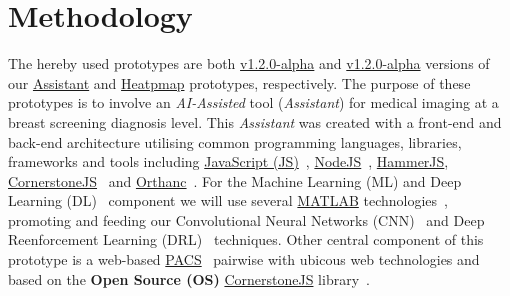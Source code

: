 
\section{Methodology}
\label{sec:sec003}

The hereby used prototypes are both \hyperlink{https://github.com/mida-project/prototype-multi-modality-assistant/releases/tag/v1.2.0-alpha}{v1.2.0-alpha} and \hyperlink{https://github.com/mida-project/prototype-heatmap/releases/tag/v1.2.0-alpha}{v1.2.0-alpha} versions of our \hyperlink{https://github.com/mida-project/prototype-multi-modality-assistant/}{Assistant} and \hyperlink{https://github.com/mida-project/prototype-heatmap}{Heatpmap} prototypes, respectively. The purpose of these prototypes is to involve an \textit{AI-Assisted} tool (\textit{Assistant}) for medical imaging at a breast screening diagnosis level. This \textit{Assistant} was created with a front-end and back-end architecture utilising common programming languages, libraries, frameworks and tools including \hyperlink{https://www.javascript.com/}{JavaScript (JS)}~\cite{flanagan2006javascript}, \hyperlink{https://nodejs.org/}{NodeJS}~\cite{wilson2018node}, \hyperlink{https://hammerjs.github.io/}{HammerJS}, \hyperlink{https://cornerstonejs.org/}{CornerstoneJS}~\cite{hostetter2018integration} and \hyperlink{https://www.orthanc-server.com/}{Orthanc}~\cite{Jodogne:ISBI2013}. For the Machine Learning (ML) and Deep Learning (DL)~\cite{ribeiro2017real, ribeiro2016real} component we will use several \hyperlink{https://www.mathworks.com/products/matlab.html}{MATLAB} technologies~\cite{vedaldi2015matconvnet}, promoting and feeding our Convolutional Neural Networks (CNN)~\cite{carneiro2015unregistered} and Deep Reenforcement Learning (DRL)~\cite{maicas2017deep} techniques. Other central component of this prototype is a web-based \hyperlink{https://www.sciencedirect.com/topics/medicine-and-dentistry/picture-archiving-and-communication-system}{PACS}~\cite{cooke2003picture} pairwise with ubicous web technologies and based on the \textbf{Open Source (OS)} \hyperlink{https://cornerstonejs.org/}{CornerstoneJS} library~\cite{feller2002understanding, hostetter2018integration}.


